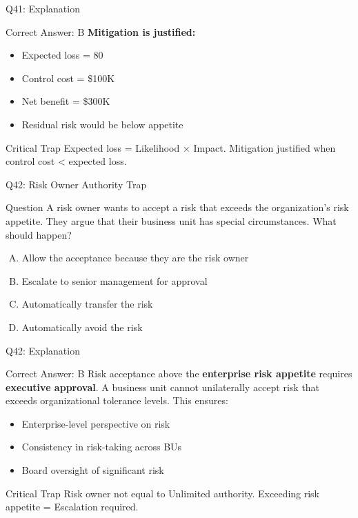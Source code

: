 \documentclass{beamer}
\begin{document}
	\begin{frame}{Q41: Explanation}
		\begin{block}{Correct Answer: B}
			\textbf{Mitigation is justified:}
			\begin{itemize}
				\item Expected loss = 80%
				\item Control cost = \$100K
				\item Net benefit = \$300K
				\item Residual risk would be below appetite
			\end{itemize}
		\end{block}
		\begin{alertblock}{Critical Trap}
			Expected loss = Likelihood × Impact.
			Mitigation justified when control cost < expected loss.
		\end{alertblock}
	\end{frame}
	
	\begin{frame}{Q42: Risk Owner Authority Trap}
		\begin{block}{Question}
			A risk owner wants to accept a risk that exceeds the organization's risk appetite. They argue that their business unit has special circumstances. What should happen?
		\end{block}
		\begin{enumerate}[(A)]
			\item Allow the acceptance because they are the risk owner
			\item Escalate to senior management for approval
			\item Automatically transfer the risk
			\item Automatically avoid the risk
		\end{enumerate}
	\end{frame}
	
	\begin{frame}{Q42: Explanation}
		\begin{block}{Correct Answer: B}
			Risk acceptance above the \textbf{enterprise risk appetite} requires \textbf{executive approval}. A business unit cannot unilaterally accept risk that exceeds organizational tolerance levels. This ensures:
			\begin{itemize}
				\item Enterprise-level perspective on risk
				\item Consistency in risk-taking across BUs
				\item Board oversight of significant risk
			\end{itemize}
		\end{block}
		\begin{alertblock}{Critical Trap}
			Risk owner not equal to Unlimited authority.
			Exceeding risk appetite = Escalation required.
		\end{alertblock}
	\end{frame}
	
\end{document}
